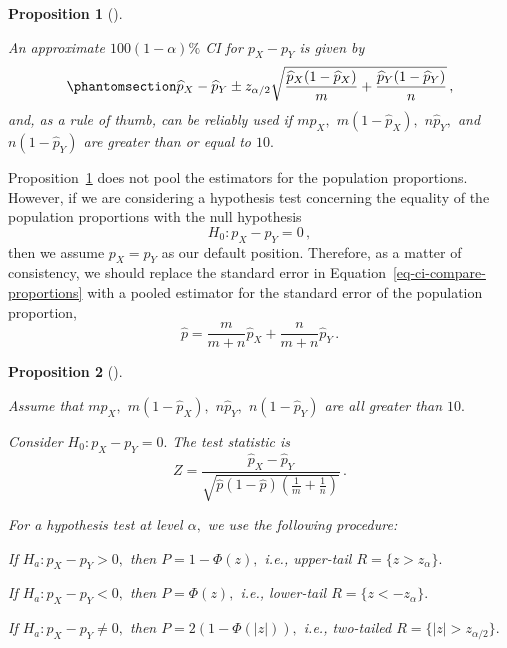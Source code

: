 \documentclass[
  a4paper,
  DIV=11,
  numbers=noendperiod,
  oneside]{scrreprt}
\theoremstyle{plain}
\theoremstyle{definition}
\theoremstyle{definition}
\theoremstyle{definition}
\theoremstyle{plain}
\newtheorem{proposition}{Proposition}[chapter]
\theoremstyle{remark}
\begin{document}
\begin{proposition}[]\protect\hypertarget{prp-ci-compare-proportions}{}\label{prp-ci-compare-proportions}

An approximate \(100(1-\alpha)\%\) CI for \(p_X - p_Y\) is given by
\begin{equation}\phantomsection\label{eq-ci-compare-proportions}{
 \widehat{p}_X - \widehat{p}_Y \pm z_{\alpha/2}\sqrt{\frac{\widehat{p}_X (1 - \widehat{p}_X)}{m} + \frac{\widehat{p}_Y (1 - \widehat{p}_Y)}{n}}\,,
}\end{equation} and, as a rule of thumb, can be reliably used if
\(m \widehat{p}_X,\) \(m (1 - \widehat{p}_X),\) \(n \widehat{p}_Y,\) and
\(n (1-\widehat{p}_Y)\) are greater than or equal to \(10.\)

\end{proposition}

Proposition~\ref{prp-ci-compare-proportions} does not pool the
estimators for the population proportions. However, if we are
considering a hypothesis test concerning the equality of the population
proportions with the null hypothesis \[
H_0 : p_X - p_Y = 0 \,,
\] then we assume \(p_X = p_Y\) as our default position. Therefore, as a
matter of consistency, we should replace the standard error in
Equation~\ref{eq-ci-compare-proportions} with a pooled estimator for the
standard error of the population proportion, \[
 \widehat{p} = \frac{m}{m + n} \widehat{p}_X + \frac{n}{m + n} \widehat{p}_Y \,.
\]

\begin{proposition}[]\protect\hypertarget{prp-htest-compare-proportions}{}\label{prp-htest-compare-proportions}

Assume that \(m \widehat{p}_X,\) \(m (1-\widehat{p}_X),\)
\(n\widehat{p}_Y,\) \(n(1-\widehat{p}_Y)\) are all greater than \(10.\)

Consider \(H_0 : p_X - p_Y = 0.\) The test statistic is \[
 Z = \frac{\widehat{p}_X - \widehat{p}_Y}{\sqrt{\widehat{p} (1 - \widehat{p}) \left( \frac{1}{m} + \frac{1}{n} \right)}} \,.
\]

For a hypothesis test at level \(\alpha,\) we use the following
procedure:

If \(H_a : p_X - p_Y > 0,\) then \(P = 1 - \Phi(z),\) i.e., upper-tail
\(R = \{z > z_{\alpha}\}.\)

If \(H_a : p_X - p_Y < 0,\) then \(P = \Phi(z),\) i.e., lower-tail
\(R = \{z < - z_{\alpha}\}.\)

If \(H_a : p_X - p_Y \neq 0,\) then \(P = 2(1-\Phi(|z|)),\) i.e.,
two-tailed \(R = \{|z| > z_{\alpha/2}\}.\)

\end{proposition}
\end{document}
